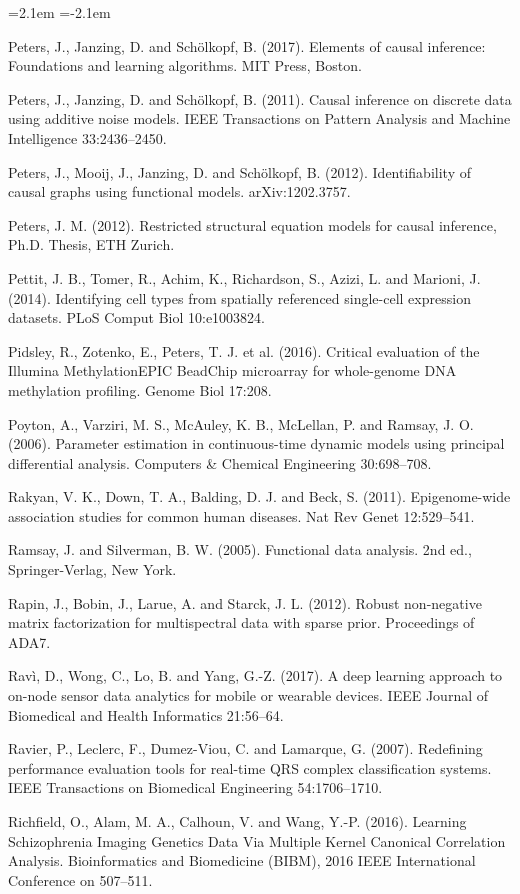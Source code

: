 \begin{list}{}{\leftmargin=2.1em  
  \itemindent=-2.1em \parsep=0pt \itemsep=2pt \topsep=0pt}
\item Peters, J., Janzing, D. and Schölkopf, B. (2017). Elements of causal inference: Foundations and learning algorithms. MIT Press, Boston.
\item Peters, J., Janzing, D. and Schölkopf, B. (2011). Causal inference on discrete data using additive noise models. IEEE Transactions on Pattern Analysis and Machine Intelligence 33:2436--2450.
\item Peters, J., Mooij, J., Janzing, D. and Schölkopf, B. (2012). Identifiability of causal graphs using functional models. arXiv:1202.3757.
\item Peters, J. M. (2012). Restricted structural equation models for causal inference, Ph.D. Thesis, ETH Zurich.
\item Pettit, J. B., Tomer, R., Achim, K., Richardson, S., Azizi, L. and Marioni, J. (2014). Identifying cell types from spatially referenced single-cell expression datasets. PLoS Comput Biol 10:e1003824.
\item Pidsley, R., Zotenko, E., Peters, T. J. et al. (2016). Critical evaluation of the Illumina MethylationEPIC BeadChip microarray for whole-genome DNA methylation profiling. Genome Biol 17:208.
\item Poyton, A., Varziri, M. S., McAuley, K. B., McLellan, P. and Ramsay, J. O. (2006). Parameter estimation in continuous-time dynamic models using principal differential analysis. Computers \& Chemical Engineering 30:698--708.
\item Rakyan, V. K., Down, T. A., Balding, D. J. and Beck, S. (2011). Epigenome-wide association studies for common human diseases. Nat Rev Genet 12:529--541.
\item Ramsay, J. and Silverman, B. W. (2005). Functional data analysis. 2nd ed., Springer-Verlag, New York.
\item Rapin, J., Bobin, J., Larue, A. and Starck, J. L. (2012). Robust non-negative matrix factorization for multispectral data with sparse prior. Proceedings of ADA7.
\item Ravì, D., Wong, C., Lo, B. and Yang, G.-Z. (2017). A deep learning approach to on-node sensor data analytics for mobile or wearable devices. IEEE Journal of Biomedical and Health Informatics 21:56--64.
\item Ravier, P., Leclerc, F., Dumez-Viou, C. and Lamarque, G. (2007). Redefining performance evaluation tools for real-time QRS complex classification systems. IEEE Transactions on Biomedical Engineering 54:1706--1710.
\item Richfield, O., Alam, M. A., Calhoun, V. and Wang, Y.-P. (2016). Learning Schizophrenia Imaging Genetics Data Via Multiple Kernel Canonical Correlation Analysis. Bioinformatics and Biomedicine (BIBM), 2016 IEEE International Conference on 507--511.

\end{list}
